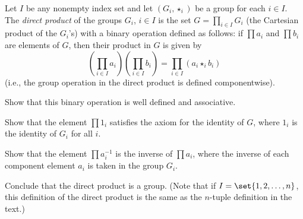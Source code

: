 \begin{exercise}\label{ex5.1.15}
    Let $I$ be any nonempty index set and let $(G_i, \star_i)$ be a group for each $i \in I$. The \emph{direct product} of the groups $G_i$, $i \in I$ is the set $G = \prod_{i \in I} G_i$ (the Cartesian product of the $G_i$'s) with a binary operation defined as follows: if $\prod a_i$ and $\prod b_i$ are elements of $G$, then their product in $G$ is given by
    \[\left(\prod_{i \in I} a_i\right)\left(\prod_{i \in I} b_i\right) = \prod_{i \in I} (a_i \star_i b_i)\]
    (i.e., the group operation in the direct product is defined componentwise).
    \begin{subproblems}
        \item Show that this binary operation is well defined and associative.
        \item Show that the element $\prod 1_i$ satisfies the axiom for the identity of $G$, where $1_i$ is the identity of $G_i$ for all $i$.
        \item Show that the element $\prod a_i^{-1}$ is the inverse of $\prod a_i$, where the inverse of each component element $a_i$ is taken in the group $G_i$.
    \end{subproblems}
    Conclude that the direct product is a group. (Note that if $I = \set{1, 2, \ldots, n}$, this definition of the direct product is the same as the $n$-tuple definition in the text.)
\end{exercise}

